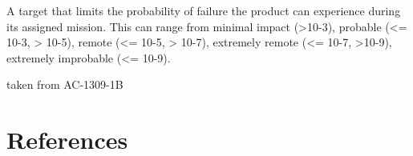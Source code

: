 \documentclass[
]{article}
\let\oldbibliography
\renewcommand{}[1]{%
  \clearpage
  \phantomsection
  \oldbibliography{#1}
}
\begin{document}
A target that limits the probability of failure the product can experience during its assigned mission. This can range from minimal impact (\textgreater10-3), probable (\textless= 10-3, \textgreater{} 10-5), remote (\textless= 10-5, \textgreater{} 10-7), extremely remote (\textless= 10-7, \textgreater10-9), extremely improbable (\textless= 10-9).

taken from AC-1309-1B

\section{References}\label{references}


\nocite{*}\renewcommand{\bibname}{References}\vspace{-2em}

  
\end{document}
